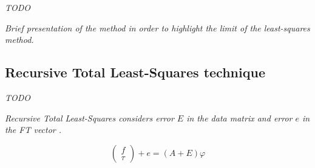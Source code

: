 \documentclass[/home/francois/latex/report/main.tex]{subfiles}
\begin{document}
\textit{TODO}

{\it
Brief presentation of the method in order to highlight the limit of the least-squares method.
}

\subsection{Recursive Total Least-Squares technique}

\textit{TODO}

{\it
Recursive Total Least-Squares considers error $E$ in the data matrix and error $e$ in the \ac{FT} vector \cite{Kubus2008}
.

\begin{equation}
 \begin{pmatrix}
  f    \\
  \tau
 \end{pmatrix} + e
 = (A + E) \varphi
\end{equation}
}
\end{document}

